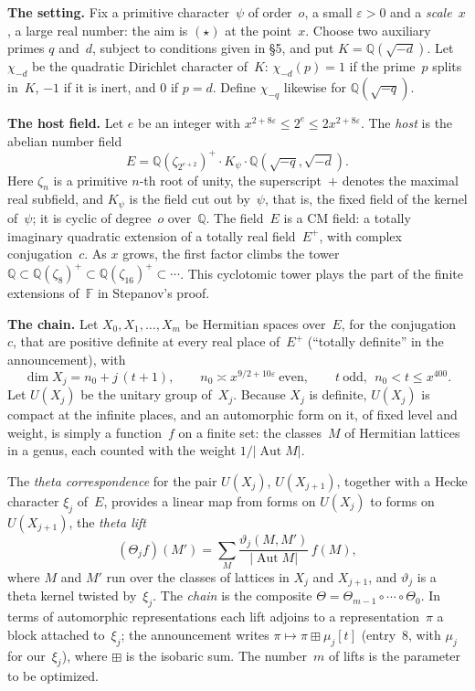\documentclass[11pt,a4paper]{article}
\newcommand{\eps}{\varepsilon}
\newcommand{\Q}{\mathbb{Q}}
\newcommand{\F}{\mathbb{F}}
\newcommand{\chid}{\chi_{-d}}
\newcommand{\chiq}{\chi_{-q}}
\newcommand{\kw}[1]{\emph{#1}}
\newcommand{\m}[1]{\mbox{$#1$}}        %
\begin{document}
\textbf{The setting.} Fix a primitive character~$\psi$ of order~$o$, a small \m{\eps>0} and a \kw{scale}~$x$, a large
real number: the aim is $(\star)$ at the point~$x$. Choose two auxiliary primes $q$ and~$d$, subject to conditions
given in §5, and put \m{K=\Q(\sqrt{-d})}. Let $\chid$ be the quadratic Dirichlet character of~$K$: \m{\chid(p)=1}
if the prime~$p$ splits in~$K$, $-1$ if it is inert, and $0$ if \m{p=d}. Define $\chiq$ likewise for
$\Q(\sqrt{-q})$.

\textbf{The host field.} Let $e$ be an integer with \m{x^{2+8\eps}\le2^e\le2x^{2+8\eps}}. The \kw{host} is the abelian
number field
\[
E=\Q(\zeta_{2^{e+2}})^{+}\cdot K_\psi\cdot\Q(\sqrt{-q},\sqrt{-d}).
\]
Here $\zeta_n$ is a primitive $n$-th root of unity, the superscript~$+$ denotes the maximal real subfield, and
$K_\psi$ is the field cut out by~$\psi$, that is, the fixed field of the kernel of~$\psi$; it is cyclic of degree~$o$
over~$\Q$. The field~$E$ is a CM field: a totally imaginary quadratic extension of a totally real field~$E^+$, with
complex conjugation~$c$. As $x$ grows, the first factor climbs the tower
\m{\Q\subset\Q(\zeta_8)^+\subset\Q(\zeta_{16})^+\subset\cdots}. This cyclotomic tower plays the part of the finite
extensions of~$\F$ in Stepanov's proof.

\textbf{The chain.} Let \m{X_0,X_1,\dots,X_m} be Hermitian spaces over~$E$, for the conjugation~$c$, that are positive
definite at every real place of~$E^+$ (``totally definite'' in the announcement), with
\[
\dim X_j=n_0+j\,(t+1),\qquad n_0\asymp x^{9/2+10\eps}\ \text{even},\qquad t\ \text{odd},\ \ n_0<t\le x^{400}.
\]
Let $U(X_j)$ be the unitary group of~$X_j$. Because $X_j$ is definite, $U(X_j)$ is compact at the infinite places, and
an automorphic form on it, of fixed level and weight, is simply a function~$f$ on a finite set: the classes~$M$ of
Hermitian lattices in a genus, each counted with the weight $1/\lvert\operatorname{Aut}M\rvert$.

The \kw{theta correspondence} for the pair $U(X_j)$, $U(X_{j+1})$, together with a Hecke character $\xi_j$ of~$E$,
provides a linear map from forms on $U(X_j)$ to forms on $U(X_{j+1})$, the \kw{theta lift}
\[
(\Theta_jf)(M')=\sum_{M}\frac{\vartheta_j(M,M')}{\lvert\operatorname{Aut}M\rvert}\,f(M),
\]
where $M$ and $M'$ run over the classes of lattices in $X_j$ and $X_{j+1}$, and $\vartheta_j$ is a theta kernel
twisted by~$\xi_j$. The \kw{chain} is the composite \m{\Theta=\Theta_{m-1}\circ\cdots\circ\Theta_0}. In terms of
automorphic representations each lift adjoins to a representation~$\pi$ a block attached to~$\xi_j$; the announcement
writes \m{\pi\mapsto\pi\boxplus\mu_j[t]} (entry~8, with $\mu_j$ for our~$\xi_j$), where $\boxplus$ is the isobaric sum.
The number~$m$ of lifts is the parameter to be optimized.
\end{document}
